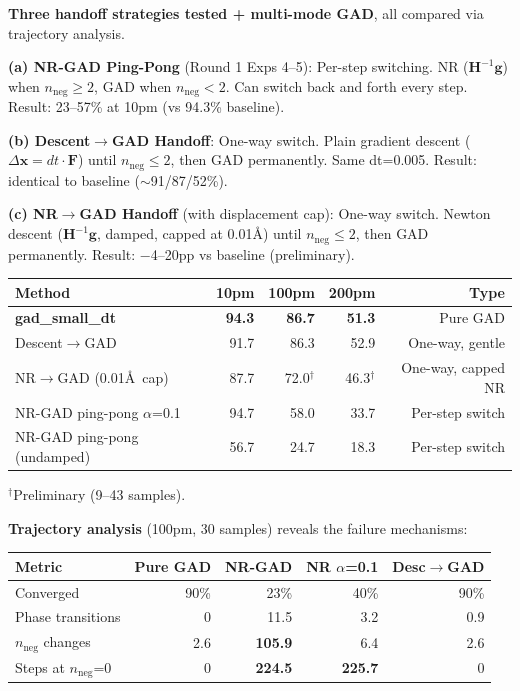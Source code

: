 \documentclass[11pt]{article}
\begin{document}
\textbf{Three handoff strategies tested + multi-mode GAD}, all compared via trajectory analysis.

\vspace{0.5em}
\textbf{(a) NR-GAD Ping-Pong} (Round 1 Exps 4--5): Per-step switching.
NR ($\mathbf{H}^{-1}\mathbf{g}$) when $n_{\text{neg}} \geq 2$, GAD when $n_{\text{neg}} < 2$.
Can switch back and forth every step. Result: 23--57\% at 10pm (vs 94.3\% baseline).

\textbf{(b) Descent$\to$GAD Handoff}: One-way switch.
Plain gradient descent ($\Delta\mathbf{x} = dt \cdot \mathbf{F}$) until $n_{\text{neg}} \leq 2$,
then GAD permanently. Same dt=0.005. Result: identical to baseline ($\sim$91/87/52\%).

\textbf{(c) NR$\to$GAD Handoff} (with displacement cap): One-way switch.
Newton descent ($\mathbf{H}^{-1}\mathbf{g}$, damped, capped at 0.01\AA) until $n_{\text{neg}} \leq 2$,
then GAD permanently. Result: $-$4--20pp vs baseline (preliminary).

\vspace{0.3em}
\begin{tabular}{l*{4}{r}}
\toprule
Method & 10pm & 100pm & 200pm & Type \\
\midrule
\textbf{gad\_small\_dt} & \textbf{94.3} & \textbf{86.7} & \textbf{51.3} & Pure GAD \\
Descent$\to$GAD & 91.7 & 86.3 & 52.9 & One-way, gentle \\
NR$\to$GAD (0.01\AA\ cap) & 87.7 & 72.0$^\dagger$ & 46.3$^\dagger$ & One-way, capped NR \\
NR-GAD ping-pong $\alpha$=0.1 & 94.7 & 58.0 & 33.7 & Per-step switch \\
NR-GAD ping-pong (undamped) & 56.7 & 24.7 & 18.3 & Per-step switch \\
\bottomrule
\end{tabular}

{\small $^\dagger$Preliminary (9--43 samples).}

\textbf{Trajectory analysis} (100pm, 30 samples) reveals the failure mechanisms:

\vspace{0.3em}
\begin{tabular}{l*{4}{r}}
\toprule
Metric & Pure GAD & NR-GAD & NR $\alpha$=0.1 & Desc$\to$GAD \\
\midrule
Converged & 90\% & 23\% & 40\% & 90\% \\
Phase transitions & 0 & 11.5 & 3.2 & 0.9 \\
$n_{\text{neg}}$ changes & 2.6 & \textbf{105.9} & 6.4 & 2.6 \\
Steps at $n_{\text{neg}}$=0 & 0 & \textbf{224.5} & \textbf{225.7} & 0 \\
\bottomrule
\end{tabular}
\end{document}
